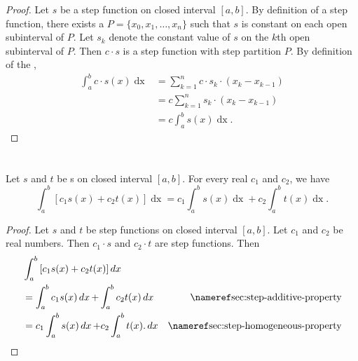 \documentclass{report}
\begin{document}
\begin{proof}

  Let $s$ be a step function on closed interval $[a, b]$.
  By definition of a step function, there exists a 
    $P = \{x_0, x_1, \ldots, x_n\}$ such that $s$ is constant on each open
    subinterval of $P$.
  Let $s_k$ denote the constant value of $s$ on the $k$th open subinterval of
    $P$.
  Then $c \cdot s$ is a step function with step partition $P$.
  By definition of the ,
    \begin{align*}
      \int_a^b c \cdot s(x) \mathop{dx}
        & = \sum_{k=1}^n c \cdot s_k \cdot (x_k - x_{k-1}) \\
        & = c \sum_{k=1}^n s_k \cdot (x_k - x_{k-1}) \\
        & = c \int_a^b s(x) \mathop{dx}.
    \end{align*}

\end{proof}

\section{}%
\label{sec:step-linearity-property}
\label{sec:theorem-1.4}

\begin{theorem}{1.4}

  Let $s$ and $t$ be s on closed interval
    $[a, b]$.
  For every real $c_1$ and $c_2$, we have
    $$\int_a^b \left[ c_1s(x) + c_2t(x) \right] \mathop{dx} =
      c_1\int_a^b s(x) \mathop{dx} + c_2\int_a^b t(x) \mathop{dx}.$$

\end{theorem}

\begin{proof}

  Let $s$ and $t$ be step functions on closed interval $[a, b]$.
  Let $c_1$ and $c_2$ be real numbers.
  Then $c_1 \cdot s$ and $c_2 \cdot t$ are step functions.
  Then
    \begin{align*}
      & \int_a^b \left[ c_1s(x) + c_2t(x) \right] \mathop{dx} \\
      & = \int_a^b c_1s(x) \mathop{dx} + \int_a^b c_2t(x) \mathop{dx}
        & \textref{sec:step-additive-property} \\
      & = c_1\int_a^b s(x) \mathop{dx} + c_2\int_a^b t(x). \mathop{dx}
        & \textref{sec:step-homogeneous-property}
    \end{align*}

\end{proof}
\end{document}
